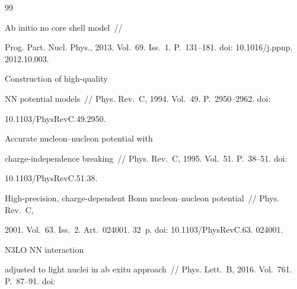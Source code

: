 {\small\frenchspacing


{%




\begin{thebibliography}{99}




 Ab initio no core shell model~/\!\!/ 


Prog. Part. Nucl. Phys., 2013. Vol.~69. Iss.~1. P.~131--181. doi: 10.1016\!/\!j.ppnp. 2012.10.003.







 Construction of high-quality 


NN potential models~/\!\!/ Phys. Rev.~C, 1994. Vol.~49. P.~2950--2962. doi: 


10.1103\!/\!PhysRevC.49.2950.













 Accurate nucleon--nucleon potential with  


charge-independence breaking~/\!\!/ Phys. Rev.~C,  1995. Vol.~51. P.~38--51. doi: 


10.1103\!/\!PhysRevC.51.38.







 High-precision, charge-dependent Bonn nucleon--nucleon potential~/\!\!/ Phys. Rev.~C, 


2001.  Vol.~63. Iss.~2. Art.~024001. 32~p. doi: 10.1103\!/\!PhysRevC.63. 024001.










 N3LO NN interaction 


adjusted to light nuclei in ab exitu approach~/\!\!/ Phys. Lett.~B, 2016. Vol.~761. P.~87--91. doi: 



\end{thebibliography}}}
